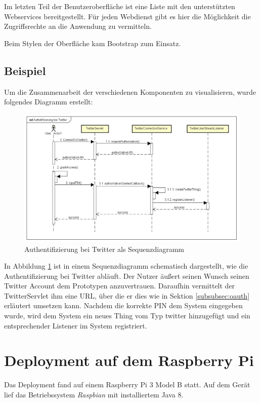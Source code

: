 Im letzten Teil der Benutzeroberfläche ist eine Liste mit den unterstützten Webservices bereitgestellt. Für jeden Webdienst gibt es hier die Möglichkeit die Zugriffsrechte an die Anwendung zu vermitteln.

Beim Stylen der Oberfläche kam Bootstrap\cite{bootstrap} zum Einsatz.


\subsection{Beispiel}
Um die Zusammenarbeit der verschiedenen Komponenten zu visualisieren, wurde folgendes Diagramm erstellt:

\begin{figure}[h]
	\centering
	\includegraphics[width=\textwidth]{bilder/sequenceOAuth}
	\caption{Authentifizierung bei Twitter als Sequenzdiagramm}
	\label{fig:sequenceOauth}
\end{figure}

In Abbildung \ref{fig:sequenceOauth} ist in einem Sequenzdiagramm schematisch dargestellt, wie die Authentifizierung bei Twitter abläuft. Der Nutzer äußert seinen Wunsch seinen Twitter Account dem Prototypen anzuvertrauen. Daraufhin vermittelt der TwitterServlet ihm eine URL, über die er dies wie in Sektion \ref{subsubsec:oauth} erläutert umsetzen kann. Nachdem die korrekte PIN dem System eingegeben wurde, wird dem System ein neues Thing vom Typ \glqq twitter\grqq{} hinzugefügt und ein entsprechender Listener im System registriert.


\section{Deployment auf dem Raspberry Pi}
\label{impl:deployment}
Das Deployment fand auf einem Raspberry Pi 3 Model B statt. Auf dem Gerät lief das Betriebssystem \textit{Raspbian} mit installiertem Java 8.


